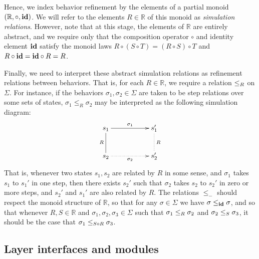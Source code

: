 Hence, we index behavior refinement by
the elements of a partial monoid $(\mathbb{R}, \circ, \textbf{id})$.
We will refer to the elements $R \in \mathbb{R}$ of this monoid
as \emph{simulation relations}.
However, note that at this stage,
the elements of $\mathbb{R}$ are entirely abstract,
and we require only that the composition operator $\circ$
and identity element $\textbf{id}$ satisfy the monoid laws
$R \circ (S \circ T) = (R \circ S) \circ T$ and
$R \circ \textbf{id} = \textbf{id} \circ R = R$.

Finally,
we need to interpret these abstract simulation relations
as refinement relations between behaviors.
That is,
for each $R \in \mathbb{R}$, we require
a relation $\le_{R}$ on $\Sigma$.
For instance,
if the behaviors $\sigma_1, \sigma_2 \in \Sigma$
are taken to be step relations over some sets of states,
$\sigma_1 \le_R \sigma_2$ may be interpreted
as the following simulation diagram:
\[ 
    \xymatrix{
        s_1 \ar[rr]^{\sigma_1} \ar@{-}[d]_R & & s'_1 \ar@{.}[d]^R \\
        s_2 \ar@{.>}[rr]_{\sigma_2} & & s'_2
    }
\]
That is, whenever two states $s_1, s_2$
are related by $R$ in some sense,
and $\sigma_1$ takes $s_1$ to $s_1'$ in one step, then
there exists $s_2'$ such that 
$\sigma_2$ takes $s_2$ to $s_2'$ in zero or more steps,
and $s_2'$ and $s_1'$ are also related by $R$.
The relations $\le_-$ should respect the monoid structure of $\mathbb{R}$,
so that for any $\sigma \in \Sigma$ we have $\sigma \le_{\textbf{id}} \sigma$,
and so that whenever $R, S \in \mathbb{R}$
and $\sigma_1, \sigma_2, \sigma_3 \in \Sigma$
such that $\sigma_1 \le_{R} \sigma_2$ and $\sigma_2 \le_{S} \sigma_3$,
it should be the case that $\sigma_1 \le_{S \circ R} \sigma_3$.

\subsection{Layer interfaces and modules}

